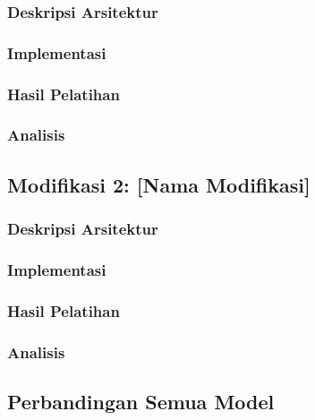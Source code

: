 \documentclass[11pt,a4paper]{article}
\begin{document}
\subsubsection{Deskripsi Arsitektur}

\subsubsection{Implementasi}

\subsubsection{Hasil Pelatihan}

\subsubsection{Analisis}

\subsection{Modifikasi 2: [Nama Modifikasi]}
\subsubsection{Deskripsi Arsitektur}

\subsubsection{Implementasi}

\subsubsection{Hasil Pelatihan}

\subsubsection{Analisis}

\subsection{Perbandingan Semua Model}
\end{document}

